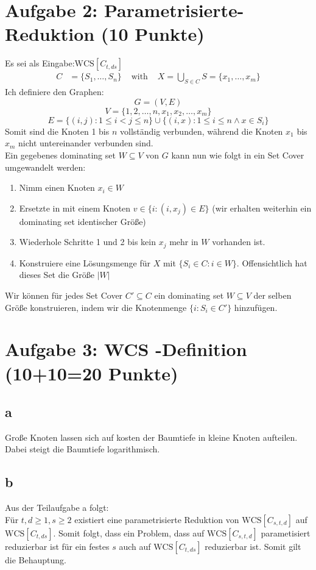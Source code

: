 \documentclass[a4paper,11pt,twoside]{scrartcl}
\begin{document}
\section{Aufgabe 2: Parametrisierte-Reduktion (10 Punkte)}
Es sei als Eingabe:$\text{WCS}[C_{t,ds}]$
\begin{align*}
C&=\{S_1,\ldots,S_n \}&\text{ with }&X = \bigcup_{S\in C}S=\{ x_1,\ldots,x_m \}
\end{align*}
Ich definiere den Graphen:
\[ G=(V,E) \]
\[ V = \{ 1,2,\ldots,n,x_1,x_2,\ldots,x_m \} \]
\[ E = \{ (i,j): 1 \leq i < j \leq n \} \cup \{ (i,x) : 1 \leq i \leq n \land x \in S_i \} \]
Somit sind die Knoten 1 bis $n$ vollständig verbunden, während die Knoten $x_1$ bis $x_m$ nicht untereinander verbunden sind.\\
Ein gegebenes dominating set $W \subseteq V$ von $G$ kann nun wie folgt in ein Set Cover umgewandelt werden:\\
\begin{enumerate}
	\item Nimm einen Knoten $x_i \in W$
	\item Ersetzte in mit einem Knoten $v \in \{i:(i,x_j)\in E\}$ (wir erhalten weiterhin ein dominating set identischer Größe)
	\item Wiederhole Schritte 1 und 2 bis kein $x_j$ mehr in $W$ vorhanden ist.
	\item Konstruiere eine Lösungsmenge für $X$ mit $\{ S_i\in C : i \in W \}$. Offensichtlich hat dieses Set die Größe $|W|$
\end{enumerate}
Wir können für jedes Set Cover $C' \subseteq C$ ein dominating set $W\subseteq V$ der selben Größe konstruieren, indem wir die Knotenmenge $\{ i : S_i \in C' \}$ hinzufügen.
\section{Aufgabe 3: WCS -Definition (10+10=20 Punkte)}
\subsection{a}
Große Knoten lassen sich auf kosten der Baumtiefe in kleine Knoten aufteilen. Dabei steigt die Baumtiefe logarithmisch.
\subsection{b}
Aus der Teilaufgabe a folgt:\\
Für $t,d \geq 1, s\geq 2$ existiert eine parametrisierte Reduktion von $\text{WCS}[C_{s,t,d}]$ auf $\text{WCS}[C_{t,ds}]$. Somit folgt, dass ein Problem, dass auf $\text{WCS}[C_{s,t,d}]$ parametisiert reduzierbar ist für ein festes $s$ auch auf  $\text{WCS}[C_{t,ds}]$ reduzierbar ist. Somit gilt die Behauptung.
\end{document}

